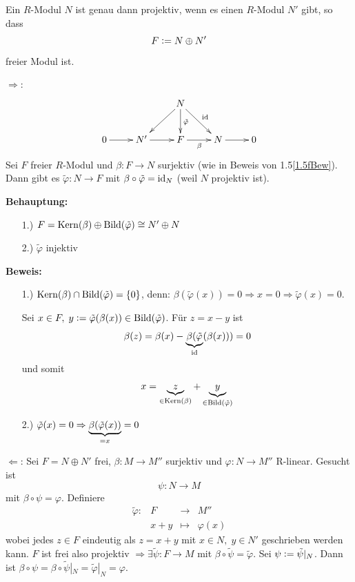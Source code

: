 \documentclass[a4paper, 10pt]{report}
\begin{document}
\begin{Prop}
\label{1.6}
  Ein $R$-Modul $N$ ist genau dann projektiv, wenn es einen $R$-Modul $N'$ gibt,
  so dass 
  \[
  F \mathrel{\mathop:}= N \oplus N'
  \]
  freier Modul ist.
\end{Prop}

\begin{Bew}
  \glqq$\Rightarrow$\grqq:
  \[\xymatrix{
  &&N\ar[dl]\ar[d]^{\tilde{\varphi}}\ar[dr]^{\id} &&\\
  0\ar[r]&N'\ar[r]&F\ar[r]_\beta&N\ar[r]&0 
  }\]
  Sei $F$ freier $R$-Modul und $\beta: F \to N$ surjektiv (wie in Beweis von
  1.5\ref{1.5fBew}). Dann gibt es $\tilde{\varphi}: N \to F$ mit $\beta \circ
  \tilde{\varphi} = \mathrm{id}_N$ (weil $N$ projektiv ist).

\textbf{Behauptung:}
  \begin{enumerate}
    \item[1.)] $F = \mathrm{Kern}(\beta) \oplus \mathrm{Bild}(\tilde{\varphi}) \cong
               N' \oplus N$
    \item[2.)] $\tilde{\varphi}$ injektiv
  \end{enumerate}
  \textbf{Beweis:}
  \begin{enumerate}
    \item[1.)] $\mathrm{Kern}(\beta) \cap \mathrm{Bild}(\tilde{\varphi}) = \{0\}$, denn:
               $\beta(\tilde{\varphi}(x)) = 0 \Rightarrow x = 0 \Rightarrow
               \tilde{\varphi}(x) = 0$.
  
               Sei $x \in F,\; y \mathrel{\mathop:}=
               \tilde{\varphi}(\beta(x)) \in \mathrm{Bild}(\tilde\varphi)$.
               Für $z = x - y$ ist
               \[
               \beta(z) = \beta(x) -
               \underbrace{\beta(\tilde{\varphi}}_{\mathrm{id}}(\beta(x)))= 0
               \]
               und somit
               \[ 
               x = \underbrace{z}_{\in
               \mathrm{Kern}(\beta)} + \underbrace{y}_{\in \mathrm{Bild}(\tilde{\varphi})}
               \]
    \item[2.)] $\tilde{\varphi}(x) = 0 \Rightarrow \underbrace{\beta(\tilde{\varphi}(x))}_{= x} = 0$
  \end{enumerate}
  \glqq$\Leftarrow$\grqq:
  Sei $F = N \oplus N'$ frei, $\beta: M \to M''$ surjektiv und $\varphi: N \to
  M''$ R-linear. Gesucht ist 
  \[
  \psi: N \to M
  \]
  mit $\beta \circ \psi = \varphi$.
  Definiere 
  \[
  \begin{matrix}
  \tilde{\varphi}:& F& \to& M''\\
  &x + y &\mapsto&\varphi(x)
  \end{matrix}
  \]
  wobei jedes $z \in F$ eindeutig als $z = x + y$ mit $x \in N,\; y
  \in N'$ geschrieben werden kann.
  $F$ ist frei also projektiv $\Rightarrow \exists \tilde{\psi}: F \to M$ mit
  $\beta \circ \tilde{\psi} = \tilde{\varphi}$. Sei $\psi \mathrel{\mathop:}=
  \tilde{\psi}|_N$. Dann ist $\beta \circ \psi = \beta \circ \tilde{\psi}|_N =
  \tilde{\varphi}|_N = \varphi$.
\end{Bew}
\end{document}
